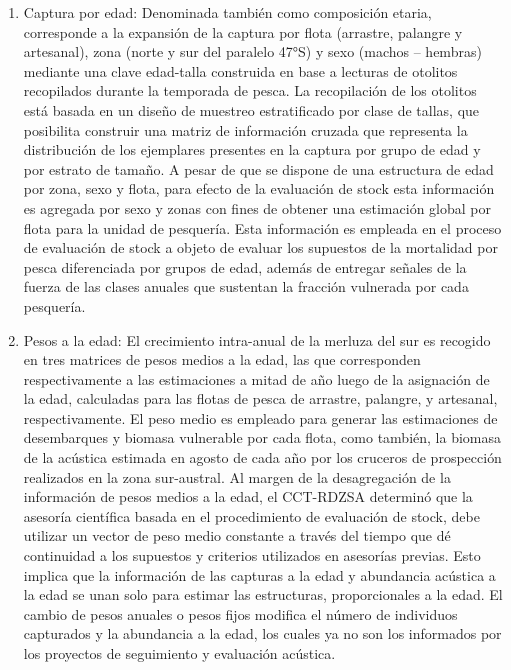 \documentclass[
  spanish,
]{article}
\begin{document}
\begin{enumerate}
\def\labelenumi{\alph{enumi})}
\item
  Captura por edad: Denominada también como composición etaria,
  corresponde a la expansión de la captura por flota (arrastre, palangre
  y artesanal), zona (norte y sur del paralelo 47°S) y sexo (machos --
  hembras) mediante una clave edad-talla construida en base a lecturas
  de otolitos recopilados durante la temporada de pesca. La recopilación
  de los otolitos está basada en un diseño de muestreo estratificado por
  clase de tallas, que posibilita construir una matriz de información
  cruzada que representa la distribución de los ejemplares presentes en
  la captura por grupo de edad y por estrato de tamaño. A pesar de que
  se dispone de una estructura de edad por zona, sexo y flota, para
  efecto de la evaluación de stock esta información es agregada por sexo
  y zonas con fines de obtener una estimación global por flota para la
  unidad de pesquería. Esta información es empleada en el proceso de
  evaluación de stock a objeto de evaluar los supuestos de la mortalidad
  por pesca diferenciada por grupos de edad, además de entregar señales
  de la fuerza de las clases anuales que sustentan la fracción vulnerada
  por cada pesquería.
\item
  Pesos a la edad: El crecimiento intra-anual de la merluza del sur es
  recogido en tres matrices de pesos medios a la edad, las que
  corresponden respectivamente a las estimaciones a mitad de año luego
  de la asignación de la edad, calculadas para las flotas de pesca de
  arrastre, palangre, y artesanal, respectivamente. El peso medio es
  empleado para generar las estimaciones de desembarques y biomasa
  vulnerable por cada flota, como también, la biomasa de la acústica
  estimada en agosto de cada año por los cruceros de prospección
  realizados en la zona sur-austral. Al margen de la desagregación de la
  información de pesos medios a la edad, el CCT-RDZSA determinó que la
  asesoría científica basada en el procedimiento de evaluación de stock,
  debe utilizar un vector de peso medio constante a través del tiempo
  que dé continuidad a los supuestos y criterios utilizados en asesorías
  previas. Esto implica que la información de las capturas a la edad y
  abundancia acústica a la edad se unan solo para estimar las
  estructuras, proporcionales a la edad. El cambio de pesos anuales o
  pesos fijos modifica el número de individuos capturados y la
  abundancia a la edad, los cuales ya no son los informados por los
  proyectos de seguimiento y evaluación acústica.
\end{enumerate}
\end{document}
